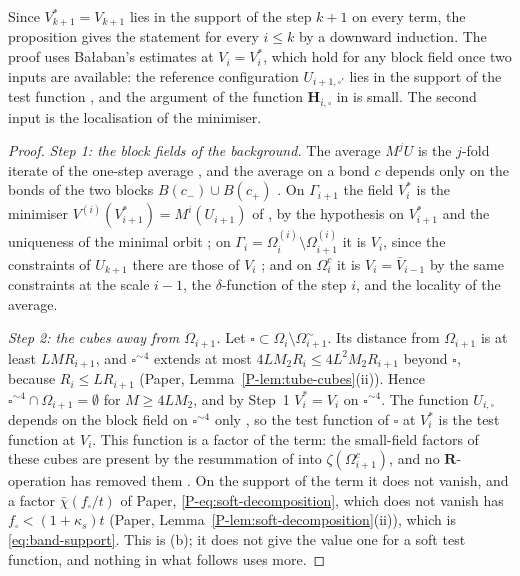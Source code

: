 \documentclass[11pt]{preprint}
\numberwithin{equation}{section}
\theoremstyle{definition}
\theoremstyle{remark}
\theoremstyle{plain}
\begin{document}
Since $V^*_{k+1} = V_{k+1}$ lies in the support of the step $k + 1$ on every term, the proposition gives the statement for every $i \leq k$ by a downward induction. The proof uses Ba{\l}aban's estimates \cite[(3.6)--(3.9), pp.~266--267]{BalabanCRE} at $V_i = V^*_i$, which hold for any block field once two inputs are available: the reference configuration $U_{i+1,\square'}$ lies in the support of the test function \cite[(3.2), p.~265]{BalabanCRE}, and the argument of the function $\mathbf H_{i,\square}$ in \cite[(3.6)]{BalabanCRE} is small. The second input is the localisation of the minimiser.

\begin{proof}
\emph{Step 1: the block fields of the background.} The average $M^jU$ is the $j$-fold iterate of the one-step average \cite[(0.21), p.~256]{BalabanRG1}, and the average on a bond $c$ depends only on the bonds of the two blocks $B(c_-) \cup B(c_+)$ \cite[(42)--(43), p.~24]{BalabanAVG}. On $\Gamma_{i+1}$ the field $V^*_i$ is the minimiser $V^{(i)}(V^*_{i+1}) = M^i(U_{i+1})$ of \cite[(3.10), p.~266]{BalabanCRE}, by the hypothesis on $V^*_{i+1}$ and the uniqueness of the minimal orbit \cite[p.~256]{BalabanCRE}; on $\Gamma_i = \Omega_i^{(i)} \setminus \Omega_{i+1}^{(i)}$ it is $V_i$, since the constraints of $U_{k+1}$ there are those of $V_i$ \cite[(2.10)--(2.12), p.~256]{BalabanCRE}; and on $\Omega_i^c$ it is $V_i = \bar V_{i-1}$ by the same constraints at the scale $i - 1$, the $\delta$-function of the step $i$, and the locality of the average.

\emph{Step 2: the cubes away from $\Omega_{i+1}$.} Let $\square \subset \Omega_i \setminus \Omega_{i+1}^\sim$. Its distance from $\Omega_{i+1}$ is at least $LMR_{i+1}$, and $\square^{\sim4}$ extends at most $4LM_2R_i \leq 4L^2M_2R_{i+1}$ beyond $\square$, because $R_i \leq LR_{i+1}$ (Paper, Lemma~\ref{P-lem:tube-cubes}(ii)). Hence $\square^{\sim4} \cap \Omega_{i+1} = \emptyset$ for $M \geq 4LM_2$, and by Step~1 $V^*_i = V_i$ on $\square^{\sim4}$. The function $U_{i,\square}$ depends on the block field on $\square^{\sim4}$ only \cite[(2.16), p.~257]{BalabanCRE}, so the test function of $\square$ at $V^*_i$ is the test function at $V_i$. This function is a factor of the term: the small-field factors of these cubes are present by the resummation of \cite[p.~267]{BalabanCRE} into $\zeta(\Omega_{i+1}^c)$, and no $\mathbf R$-operation has removed them \cite[p.~177, (ii)]{BalabanLFR1}. On the support of the term it does not vanish, and a factor $\bar\chi(f_\square/t)$ of Paper, \eqref{P-eq:soft-decomposition}, which does not vanish has $f_\square < (1 + \kappa_s)t$ (Paper, Lemma~\ref{P-lem:soft-decomposition}(ii)), which is \eqref{eq:band-support}. This is (b); it does not give the value one for a soft test function, and nothing in what follows uses more.


\end{proof}
\end{document}
